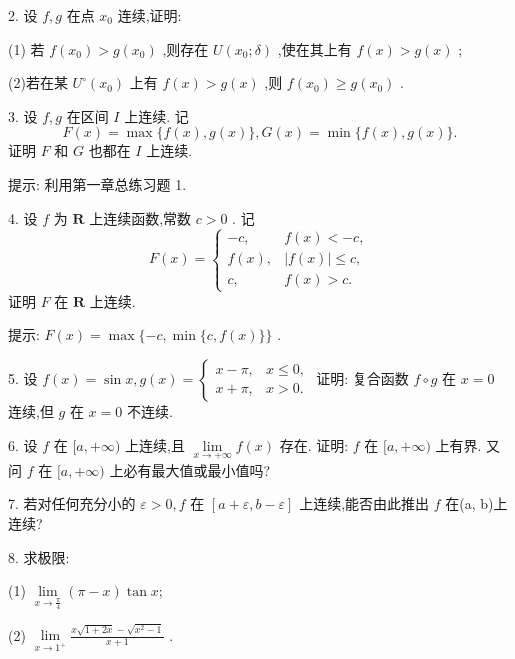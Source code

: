 2. 设 \(f,g\) 在点 \({x}_{0}\) 连续,证明:

(1) 若 \(f\left( {x}_{0}\right)  > g\left( {x}_{0}\right)\) ,则存在 \(U\left( {{x}_{0};\delta }\right)\) ,使在其上有 \(f\left( x\right)  > g\left( x\right)\) ;

(2)若在某 \({U}^{ \circ  }\left( {x}_{0}\right)\) 上有 \(f\left( x\right)  > g\left( x\right)\) ,则 \(f\left( {x}_{0}\right)  \geq  g\left( {x}_{0}\right)\) .

3. 设 \(f,g\) 在区间 \(I\) 上连续. 记
\[
F\left( x\right)  = \max \{ f\left( x\right) ,g\left( x\right) \} ,G\left( x\right)  = \min \{ f\left( x\right) ,g\left( x\right) \} .
\]
证明 \(F\) 和 \(G\) 也都在 \(I\) 上连续.

提示: 利用第一章总练习题 1.

4. 设 \(f\) 为 \(\mathbf{R}\) 上连续函数,常数 \(c > 0\) . 记
\[
F\left( x\right)  = \left\{  \begin{matrix}  - c, & f\left( x\right)  <  - c, \\  f\left( x\right) , & \left| {f\left( x\right) }\right|  \leq  c, \\  c, & f\left( x\right)  > c. \end{matrix}\right.
\]
证明 \(F\) 在 \(\mathbf{R}\) 上连续.

提示: \(F\left( x\right)  = \max \{  - c,\min \{ c,f\left( x\right) \} \}\) .

5. 设 \(f\left( x\right)  = \sin x,g\left( x\right)  = \left\{  \begin{array}{ll} x - \pi , & x \leq  0, \\  x + \pi , & x > 0. \end{array}\right.\) 证明: 复合函数 \(f \circ  g\) 在 \(x = 0\) 连续,但 \(g\) 在 \(x = 0\) 不连续.

6. 设 \(f\) 在 \(\lbrack a, + \infty )\) 上连续,且 \(\mathop{\lim }\limits_{{x \rightarrow   + \infty }}f\left( x\right)\) 存在. 证明: \(f\) 在 \(\lbrack a, + \infty )\) 上有界. 又问 \(f\) 在 \(\lbrack a, + \infty )\) 上必有最大值或最小值吗?

7. 若对任何充分小的 \(\varepsilon  > 0,f\) 在 \(\left\lbrack  {a + \varepsilon ,b - \varepsilon }\right\rbrack\) 上连续,能否由此推出 \(f\) 在(a, b)上连续?

8. 求极限:

(1) \(\mathop{\lim }\limits_{{x \rightarrow  \frac{\pi }{4}}}\left( {\pi  - x}\right) \tan x\);

(2) \(\mathop{\lim }\limits_{{x \rightarrow  {1}^{ + }}}\frac{x\sqrt{1 + {2x}} - \sqrt{{x}^{2} - 1}}{x + 1}\) .

